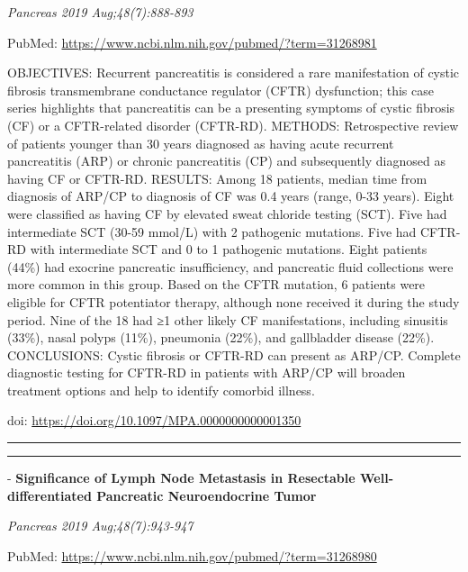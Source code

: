 \documentclass[]{article}
\begin{document}
\emph{Pancreas 2019 Aug;48(7):888-893}

PubMed: \url{https://www.ncbi.nlm.nih.gov/pubmed/?term=31268981}

OBJECTIVES: Recurrent pancreatitis is considered a rare manifestation of
cystic fibrosis transmembrane conductance regulator (CFTR) dysfunction;
this case series highlights that pancreatitis can be a presenting
symptoms of cystic fibrosis (CF) or a CFTR-related disorder (CFTR-RD).
METHODS: Retrospective review of patients younger than 30 years
diagnosed as having acute recurrent pancreatitis (ARP) or chronic
pancreatitis (CP) and subsequently diagnosed as having CF or CFTR-RD.
RESULTS: Among 18 patients, median time from diagnosis of ARP/CP to
diagnosis of CF was 0.4 years (range, 0-33 years). Eight were classified
as having CF by elevated sweat chloride testing (SCT). Five had
intermediate SCT (30-59 mmol/L) with 2 pathogenic mutations. Five had
CFTR-RD with intermediate SCT and 0 to 1 pathogenic mutations. Eight
patients (44\%) had exocrine pancreatic insufficiency, and pancreatic
fluid collections were more common in this group. Based on the CFTR
mutation, 6 patients were eligible for CFTR potentiator therapy,
although none received it during the study period. Nine of the 18 had ≥1
other likely CF manifestations, including sinusitis (33\%), nasal polyps
(11\%), pneumonia (22\%), and gallbladder disease (22\%). CONCLUSIONS:
Cystic fibrosis or CFTR-RD can present as ARP/CP. Complete diagnostic
testing for CFTR-RD in patients with ARP/CP will broaden treatment
options and help to identify comorbid illness.

doi: \url{https://doi.org/10.1097/MPA.0000000000001350}

{}

{}

\begin{center}\rule{0.5\linewidth}{\linethickness}\end{center}

\begin{center}\rule{0.5\linewidth}{\linethickness}\end{center}

 - \textbf{Significance of Lymph Node Metastasis in Resectable
Well-differentiated Pancreatic Neuroendocrine Tumor}

\emph{Pancreas 2019 Aug;48(7):943-947}

PubMed: \url{https://www.ncbi.nlm.nih.gov/pubmed/?term=31268980}
\end{document}
